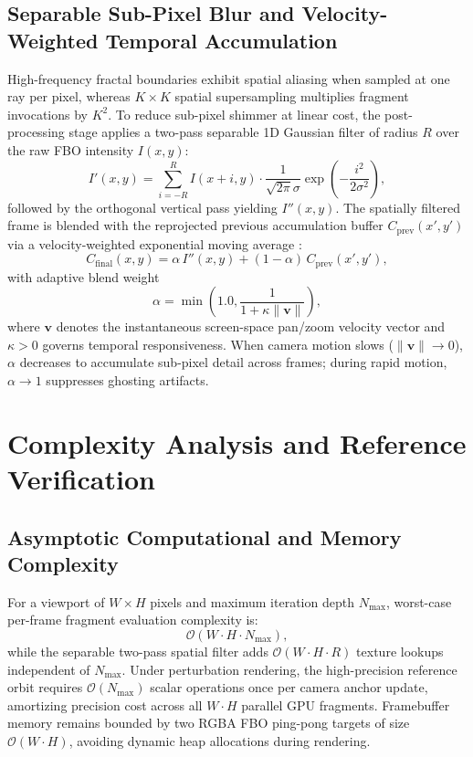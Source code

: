 \documentclass[11pt, a4paper]{article}
\begin{document}
\subsection{Separable Sub-Pixel Blur and Velocity-Weighted Temporal Accumulation}

High-frequency fractal boundaries exhibit spatial aliasing when sampled at one ray per pixel, whereas $K \times K$ spatial supersampling multiplies fragment invocations by $K^2$. To reduce sub-pixel shimmer at linear cost, the post-processing stage applies a two-pass separable 1D Gaussian filter of radius $R$ over the raw FBO intensity $I(x,y)$:
\begin{equation}
  I'(x,y) = \sum_{i=-R}^{R} I(x + i, y) \cdot \frac{1}{\sqrt{2\pi}\sigma} \exp\left(-\frac{i^2}{2\sigma^2}\right),
\end{equation}
followed by the orthogonal vertical pass yielding $I''(x,y)$. The spatially filtered frame is blended with the reprojected previous accumulation buffer $C_{\mathrm{prev}}(x',y')$ via a velocity-weighted exponential moving average \cite{karis2014taa, yang2020taa}:
\begin{equation}
  C_{\mathrm{final}}(x,y) = \alpha \, I''(x,y) + (1 - \alpha) \, C_{\mathrm{prev}}(x',y'),
\end{equation}
with adaptive blend weight
\begin{equation}
  \alpha = \min\left(1.0, \frac{1}{1 + \kappa \|\mathbf{v}\|}\right),
\end{equation}
where $\mathbf{v}$ denotes the instantaneous screen-space pan/zoom velocity vector and $\kappa > 0$ governs temporal responsiveness. When camera motion slows ($\|\mathbf{v}\| \to 0$), $\alpha$ decreases to accumulate sub-pixel detail across frames; during rapid motion, $\alpha \to 1$ suppresses ghosting artifacts.

\section{Complexity Analysis and Reference Verification}

\subsection{Asymptotic Computational and Memory Complexity}

For a viewport of $W \times H$ pixels and maximum iteration depth $N_{\max}$, worst-case per-frame fragment evaluation complexity is:
\begin{equation}
  \mathcal{O}(W \cdot H \cdot N_{\max}),
\end{equation}
while the separable two-pass spatial filter adds $\mathcal{O}(W \cdot H \cdot R)$ texture lookups independent of $N_{\max}$. Under perturbation rendering, the high-precision reference orbit requires $\mathcal{O}(N_{\max})$ scalar operations once per camera anchor update, amortizing precision cost across all $W \cdot H$ parallel GPU fragments. Framebuffer memory remains bounded by two RGBA FBO ping-pong targets of size $\mathcal{O}(W \cdot H)$, avoiding dynamic heap allocations during rendering.
\end{document}
